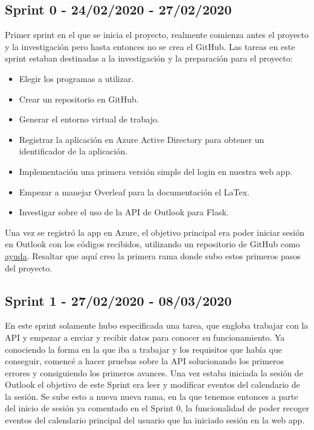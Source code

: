 \subsection{Sprint 0 - 24/02/2020 - 27/02/2020}
Primer sprint en el que se inicia el proyecto, realmente comienza antes el proyecto y la investigación pero hasta entonces no se crea el GitHub. Las tareas en este sprint estaban destinadas a la investigación y la preparación para el proyecto:
\begin{itemize}
    \item Elegir los programas a utilizar. 
	\item Crear un repositorio en GitHub.
    \item Generar el entorno virtual de trabajo.
    \item Registrar la aplicación en Azure Active Directory para obtener un identificador de la aplicación.
	\item Implementación una primera versión simple del login en nuestra web app.
	\item Empezar a manejar Overleaf para la documentación el LaTex.
	\item Investigar sobre el uso de la API de Outlook para Flask.
\end{itemize}
Una vez se registró la app en Azure, el objetivo principal era poder iniciar sesión en Outlook con los códigos recibidos, utilizando un repositorio de GitHub como \href{https://github.com/brysontyrrell/Office-365-Flask-App}{ayuda}\cite{loginO365}.
Resaltar que aquí creo la primera rama donde subo estos primeros pasos del proyecto.
\subsection{Sprint 1 - 27/02/2020 - 08/03/2020}
En este sprint solamente hubo especificada una tarea, que engloba trabajar con la API y empezar a enviar y recibir datos para conocer su funcionamiento. Ya conociendo la forma en la que iba a trabajar y los requisitos que había que conseguir, comencé a hacer pruebas sobre la API solucionando los primeros errores y consiguiendo los primeros avances.\newline
Una vez estaba iniciada la sesión de Outlook el objetivo de este Sprint era leer y modificar eventos del calendario de la sesión. Se sube esto a nueva nueva rama, en la que tenemos entonces a parte del inicio de sesión ya comentado en el Sprint 0, la funcionalidad de poder recoger eventos del calendario principal del usuario que ha iniciado sesión en la web app.

